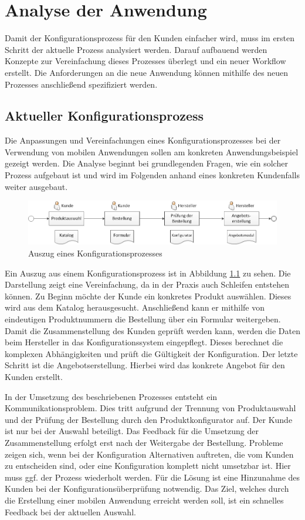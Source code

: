 \chapter{Analyse der Anwendung}\label{chapter_3}
Damit der Konfigurationsprozess für den Kunden einfacher wird, muss im ersten Schritt der aktuelle Prozess analysiert werden. Darauf aufbauend werden Konzepte zur Vereinfachung dieses Prozesses überlegt und ein neuer Workflow erstellt. Die Anforderungen an die neue Anwendung können mithilfe des neuen Prozesses anschließend spezifiziert werden.

\section{Aktueller Konfigurationsprozess}
Die Anpassungen und Vereinfachungen eines Konfigurationsprozesses bei der Verwendung von mobilen Anwendungen sollen am konkreten Anwendungsbeispiel gezeigt werden. Die Analyse beginnt bei grundlegenden Fragen, wie ein solcher Prozess aufgebaut ist und wird im Folgenden anhand eines konkreten Kundenfalls weiter ausgebaut.

\begin{figure}
\label{oldWorkflow}
\centering
\includegraphics[width=\hsize]{images/konfigurationsprozess_alt}
\caption{Auszug eines Konfigurationsprozesses}
\end{figure}
Ein Auszug aus einem Konfigurationsprozess ist in Abbildung  \ref{oldWorkflow} zu sehen. Die Darstellung zeigt eine Vereinfachung, da in der Praxis auch Schleifen entstehen können. Zu Beginn möchte der Kunde ein konkretes Produkt auswählen. Dieses wird aus dem Katalog herausgesucht.  Anschließend kann er mithilfe von eindeutigen Produktnummern die Bestellung über ein Formular weitergeben. Damit die Zusammenstellung des Kunden geprüft werden kann, werden die Daten beim Hersteller in das Konfigurationssystem eingepflegt. Dieses berechnet die komplexen Abhängigkeiten und prüft die Gültigkeit der Konfiguration. Der letzte Schritt ist die Angebotserstellung. Hierbei wird das konkrete Angebot für den Kunden erstellt.
\par

In der Umsetzung des beschriebenen Prozesses entsteht ein Kommunikationsproblem. Dies tritt aufgrund der Trennung von Produktauswahl und der Prüfung der Bestellung durch den Produktkonfigurator auf. Der Kunde ist nur bei der Auswahl beteiligt. Das Feedback für die Umsetzung der Zusammenstellung erfolgt erst nach der Weitergabe der Bestellung. Probleme zeigen sich, wenn bei der Konfiguration Alternativen auftreten, die vom Kunden zu entscheiden sind, oder eine Konfiguration komplett nicht umsetzbar ist. Hier muss ggf. der Prozess wiederholt werden. Für die Lösung ist eine Hinzunahme des Kunden bei der Konfigurationsüberprüfung notwendig. Das Ziel, welches durch die Erstellung einer mobilen Anwendung erreicht werden soll, ist ein schnelles Feedback bei der aktuellen Auswahl. \par 

